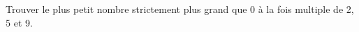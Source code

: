 \documentclass[exercice]{thedocument}%
\begin{document}
%
Trouver le plus petit nombre strictement plus grand que 0 à la fois multiple
de 2, 5 et 9.
\end{document}
